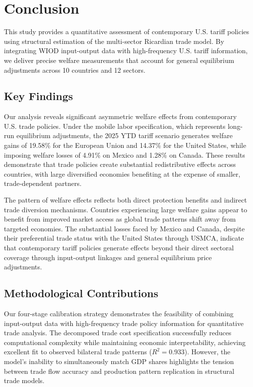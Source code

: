 \section{Conclusion}

This study provides a quantitative assessment of contemporary U.S. tariff policies using structural estimation of the \cite{costinot2012TheReviewofEconomicStudies} multi-sector Ricardian trade model. By integrating WIOD input-output data with high-frequency U.S. tariff information, we deliver precise welfare measurements that account for general equilibrium adjustments across 10 countries and 12 sectors.

\subsection{Key Findings}

Our analysis reveals significant asymmetric welfare effects from contemporary U.S. trade policies. Under the mobile labor specification, which represents long-run equilibrium adjustments, the 2025 YTD tariff scenario generates welfare gains of 19.58\% for the European Union and 14.37\% for the United States, while imposing welfare losses of 4.91\% on Mexico and 1.28\% on Canada. These results demonstrate that trade policies create substantial redistributive effects across countries, with large diversified economies benefiting at the expense of smaller, trade-dependent partners.

The pattern of welfare effects reflects both direct protection benefits and indirect trade diversion mechanisms. Countries experiencing large welfare gains appear to benefit from improved market access as global trade patterns shift away from targeted economies. The substantial losses faced by Mexico and Canada, despite their preferential trade status with the United States through USMCA, indicate that contemporary tariff policies generate effects beyond their direct sectoral coverage through input-output linkages and general equilibrium price adjustments.

\subsection{Methodological Contributions}

Our four-stage calibration strategy demonstrates the feasibility of combining input-output data with high-frequency trade policy information for quantitative trade analysis. The decomposed trade cost specification successfully reduces computational complexity while maintaining economic interpretability, achieving excellent fit to observed bilateral trade patterns ($R^2 = 0.933$). However, the model's inability to simultaneously match GDP shares highlights the tension between trade flow accuracy and production pattern replication in structural trade models.

